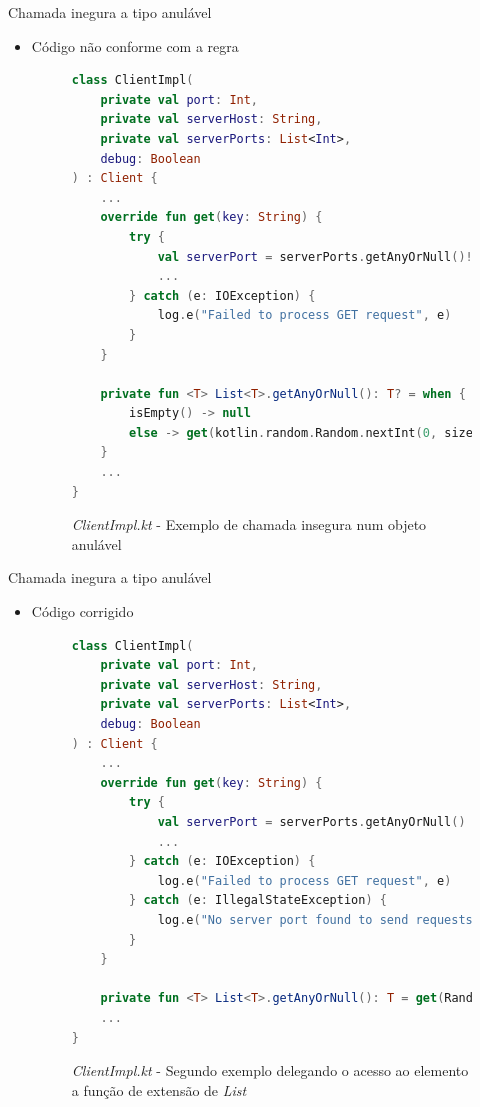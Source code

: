 \documentclass[brazilian]{beamer}
\begin{document}
\begin{frame}[fragile]{Chamada inegura a tipo anulável}
    \begin{itemize}
        \item Código não conforme com a regra
        \begin{figure}[H]
            \centering
            \begin{lstlisting}[language=Kotlin]
class ClientImpl(
    private val port: Int,
    private val serverHost: String,
    private val serverPorts: List<Int>,
    debug: Boolean
) : Client {
    ...
    override fun get(key: String) {
        try {
            val serverPort = serverPorts.getAnyOrNull()!!
            ...
        } catch (e: IOException) {
            log.e("Failed to process GET request", e)
        }
    }

    private fun <T> List<T>.getAnyOrNull(): T? = when {
        isEmpty() -> null
        else -> get(kotlin.random.Random.nextInt(0, size))
    }
    ...
}
            \end{lstlisting}
            \caption{\textit{ClientImpl.kt} - Exemplo de chamada insegura num objeto anulável}
            \label{fig:detekt_unsafe_null_call_on_nullable_before_example}
        \end{figure}
    \end{itemize}
\end{frame}

\begin{frame}[fragile]{Chamada inegura a tipo anulável}
    \begin{itemize}
        \item Código corrigido
        \begin{figure}[H]
            \centering
            \begin{lstlisting}[language=Kotlin]
class ClientImpl(
    private val port: Int,
    private val serverHost: String,
    private val serverPorts: List<Int>,
    debug: Boolean
) : Client {
    ...
    override fun get(key: String) {
        try {
            val serverPort = serverPorts.getAnyOrNull()
            ...
        } catch (e: IOException) {
            log.e("Failed to process GET request", e)
        } catch (e: IllegalStateException) {
            log.e("No server port found to send requests", e)
        }
    }

    private fun <T> List<T>.getAnyOrNull(): T = get(Random.nextInt(lastIndex))
    ...
}
            \end{lstlisting}
            \caption{\textit{ClientImpl.kt} - Segundo exemplo delegando o acesso ao elemento a função de extensão de \textit{List}}
            \label{fig:detekt_unsafe_null_call_on_nullable_after_second_example}
        \end{figure}
    \end{itemize}
\end{frame}
\end{document}
